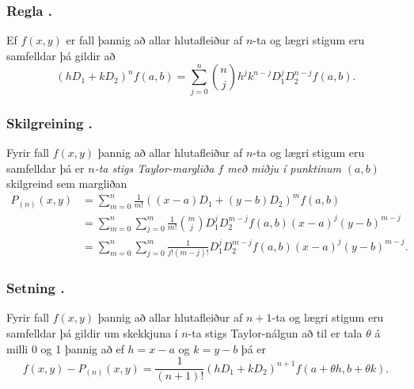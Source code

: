 \subsubsection{Regla \kaflanr.}

Ef $f(x,y)$ er fall þannig að allar hlutafleiður af $n$-ta og lægri stigum eru samfelldar þá gildir að 
$$(hD_1+kD_2)^nf(a,b)=\sum_{j=0}^n \textstyle{n\choose j}
h^jk^{n-j}D_1^jD_2^{n-j}f(a,b).$$



\subsubsection{Skilgreining \kaflanr.}
Fyrir fall $f(x,y)$ þannig að allar
hlutafleiður af $n$-ta og lægri stigum eru samfelldar þá er {\em $n$-ta
stigs Taylor-margliða $f$ með miðju í punktinum} $(a,b)$ skilgreind sem
margliðan  
\begin{align*}
P_{(n)}(x,y)&= \sum_{m=0}^n \frac{1}{m!}((x-a)D_1+(y-b)D_2)^m f(a,b)\\
&=\sum_{m=0}^n\sum_{j=0}^m \frac{1}{m!}\textstyle{m\choose j}
D_1^jD_2^{m-j}f(a,b)(x-a)^j(y-b)^{m-j}\\
&=\sum_{m=0}^n\sum_{j=0}^m \frac{1}{j!(m-j)!}
D_1^jD_2^{m-j}f(a,b)(x-a)^j(y-b)^{m-j}.
\end{align*}




\subsubsection{Setning \kaflanr.}
 Fyrir fall $f(x,y)$ þannig að allar hlutafleiður af $n+1$-ta og lægri stigum eru samfelldar þá gildir um skekkjuna í  $n$-ta stigs Taylor-nálgun að til er tala $\theta$ á milli 0 og 1 þannig að ef $h=x-a$ og $k=y-b$ þá er 
$$f(x,y)-P_{(n)}(x,y)=\frac{1}{(n+1)!}(hD_1+kD_2)^{n+1}
f(a+\theta h, b+\theta k).$$






